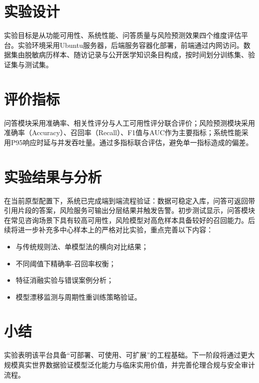 \section{实验设计}
实验目标是从功能可用性、系统性能、问答质量与风险预测效果四个维度评估平台。实验环境采用Ubuntu服务器，后端服务容器化部署，前端通过内网访问。数据集由脱敏病历样本、随访记录与公开医学知识条目构成，按时间划分训练集、验证集与测试集。

\section{评价指标}
问答模块采用准确率、相关性评分与人工可用性评分联合评价；风险预测模块采用准确率（Accuracy）、召回率（Recall）、F1值与AUC作为主要指标；系统性能采用P95响应时延与并发吞吐量。通过多指标联合评估，避免单一指标造成的偏差。

\section{实验结果与分析}
在当前原型配置下，系统已完成端到端流程验证：数据可稳定入库，问答可返回带引用片段的答案，风险服务可输出分层结果并触发告警。初步测试显示，问答模块在常见咨询场景下具有较高可用性，风险模型对高危样本具备较好的召回能力。后续将进一步补充多中心样本上的严格对比实验，重点完善以下内容：
\begin{itemize}
  \item 与传统规则法、单模型法的横向对比结果；
  \item 不同阈值下精确率-召回率权衡；
  \item 特征消融实验与错误案例分析；
  \item 模型漂移监测与周期性重训练策略验证。
\end{itemize}

\section{小结}
实验表明该平台具备“可部署、可使用、可扩展”的工程基础。下一阶段将通过更大规模真实世界数据验证模型泛化能力与临床实用价值，并完善伦理合规与安全审计流程。
